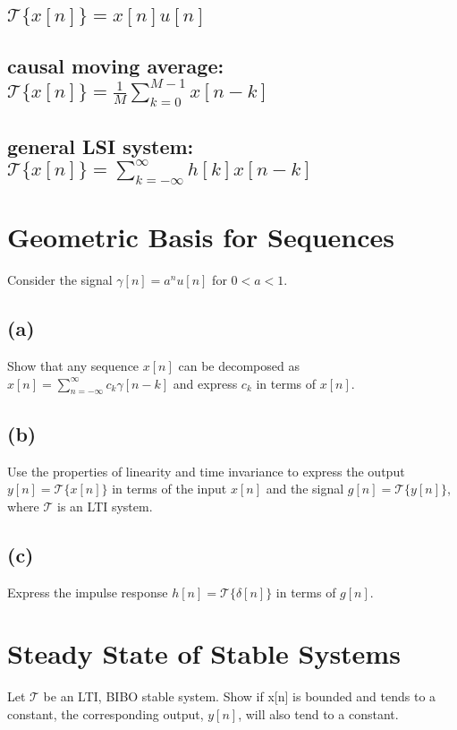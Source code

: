 \documentclass[11pt]{article}
\begin{document}
\subsection{$\mathcal{T}\{x[n]\}=x[n]u[n]$}

\subsection{causal moving average: $\mathcal{T}\{x[n]\}=\frac{1}{M}\sum\limits_{k=0}^{M-1} x[n-k]$}

\subsection{general LSI system: $\mathcal{T}\{x[n]\}=\sum\limits_{k=-\infty}^\infty h[k]x[n-k]$}

\section{Geometric Basis for Sequences}
Consider the signal $\gamma[n]=a^nu[n]$ for $0<a<1$. 

\subsection*{(a)} 
Show that any sequence $x[n]$ can be decomposed as $x[n]=\sum\limits_{n=-\infty}^\infty c_k \gamma[n-k]$ and express $c_k$ in terms of $x[n]$. 

\subsection*{(b)} 
Use the properties of linearity and time invariance to express the output $y[n] = \mathcal{T}\{x[n]\}$ in terms of the input $x[n]$ and the signal $g[n]=\mathcal{T}\{y[n]\}$, where $\mathcal{T}$ is an LTI system.

\subsection*{(c)} 
Express the impulse response $h[n]=\mathcal{T}\{\delta[n]\}$ in terms of $g[n]$.

\section{Steady State of Stable Systems}
Let $\mathcal{T}$ be an LTI, BIBO stable system. Show if x[n] is bounded and tends to a constant, the corresponding output, $y[n]$, will also tend to a constant.
\end{document}
